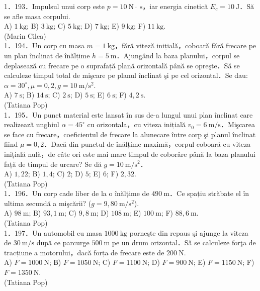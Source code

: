 1．193．Impulsul unui corp este $p=10 \mathrm{~N} \cdot \mathrm{~s}$，iar energia cinetică $E_{c}=10 \mathrm{~J}$．Să se afle masa corpului.\\ A) $1 \mathrm{~kg}$; B) $3 \mathrm{~kg}$; C) $5 \mathrm{~kg}$; D) $7 \mathrm{~kg}$; E) $9 \mathrm{~kg}$; F) $11 \mathrm{~kg}$.\\ (Marin Cilea)\\

1．194．Un corp cu masa $m=1 \mathrm{~kg}$，fără viteză inițială，coboară fără frecare pe un plan înclinat de înălțime $h=5 \mathrm{~m}$．Ajungând la baza planului，corpul se deplasează cu frecare pe o suprafață plană orizontală până se opreşte．Să se calculeze timpul total de mişcare pe planul înclinat şi pe cel orizontal．Se dau: $\alpha=30^{\circ}, \mu=0,2, g=10 \mathrm{~m} / \mathrm{s}^{2}$.\\ A) $7\mathrm{~s}$; B) $14 \mathrm{~s}$; C) $2 \mathrm{~s}$; D) $5 \mathrm{~s}$; E) $6 \mathrm{~s}$; F) $4,2 \mathrm{~s}$.\\ (Tatiana Pop)\\

1．195．Un punct material este lansat în sus de-a lungul unui plan înclinat care realizează unghiul $\alpha=45^{\circ}$ cu orizontala，cu viteza inițială $v_{0}=6 \mathrm{~m} / \mathrm{s}$．Mişcarea se face cu frecare，coeficientul de frecare la alunecare între corp şi planul înclinat fiind $\mu=0,2$．Dacă din punctul de înălțime maximă，corpul coboară cu viteza inițială nulă，de câte ori este mai mare timpul de coborâre până la baza planului față de timpul de urcare? Se dă $g=10 \mathrm{~m} / \mathrm{s}^{2}$．\\ A) $1,22$; B) $1,4$; C) $2$; D) $5$; E) $6$; F) $2,32$.\\ (Tatiana Pop)\\

1．196．Un corp cade liber de la o înălțime de $490 \mathrm{~m}$．Ce spațiu străbate el în ultima secundă a mişcării? ($g=9,80 \mathrm{~m} / \mathrm{s}^{2}$).\\ A) $98 \mathrm{~m}$; B) $93,1 \mathrm{~m}$; C) $9,8 \mathrm{~m}$; D) $108 \mathrm{~m}$; E) $100 \mathrm{~m}$; F) $88,6 \mathrm{~m}$.\\ (Tatiana Pop)\\

1．197．Un automobil cu masa $1000 \mathrm{~kg}$ porneşte din repaus şi ajunge la viteza de $30 \mathrm{~m} / \mathrm{s}$ după ce parcurge $500 \mathrm{~m}$ pe un drum orizontal．Să se calculeze forţa de tracțiune a motorului，dacă forța de frecare este de $200 \mathrm{~N}$.\\ A) $F=1000 \mathrm{~N}$; В) $F=1050 \mathrm{~N}$; C) $F=1100 \mathrm{~N}$; D) $F=900 \mathrm{~N}$; E) $F=1150 \mathrm{~N}$; F) $F=1350 \mathrm{~N}$.\\ (Tatiana Pop)\\

